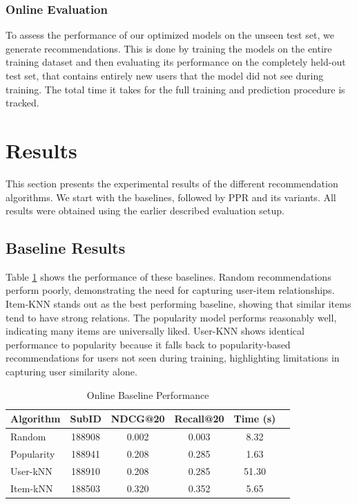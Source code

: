 \documentclass[conference,compsoc]{IEEEtran}
\begin{document}
\subsubsection{Online Evaluation}
To assess the performance of our optimized models on the unseen test set, we generate recommendations. This is done by training the models on the entire training dataset and then evaluating its performance on the completely held-out test set, that contains entirely new users that the model did not see during training. The total time it takes for the full training and prediction procedure is tracked.

\section{Results}
This section presents the experimental results of the different recommendation algorithms. We start with the baselines, followed by PPR and its variants. All results were obtained using the earlier described evaluation setup.

\subsection{Baseline Results}
Table \ref{tab:baseline_results} shows the performance of these baselines. Random recommendations perform poorly, demonstrating the need for capturing user-item relationships. Item-KNN stands out as the best performing baseline, showing that similar items tend to have strong relations. The popularity model performs reasonably well, indicating many items are universally liked. User-KNN shows identical performance to popularity because it falls back to popularity-based recommendations for users not seen during training, highlighting limitations in capturing user similarity alone.
\begin{table}[!ht]
    \centering
    \caption{Online Baseline Performance}
    \label{tab:baseline_results}
    \begin{tabular}{@{}lccccc@{}}
    \toprule
    \textbf{Algorithm} & \textbf{SubID} & \textbf{NDCG@20} & \textbf{Recall@20} & \textbf{Time (s)} \\
    \midrule
    Random  & 188908 & 0.002 & 0.003 & 8.32 \\
    Popularity & 188941 & 0.208 & 0.285 & 1.63 \\
    User-kNN & 188910 & 0.208 & 0.285 & 51.30 \\
    Item-kNN & 188503 & 0.320 & 0.352 & 5.65 \\
    \bottomrule
    \end{tabular}
\end{table}
\end{document}
